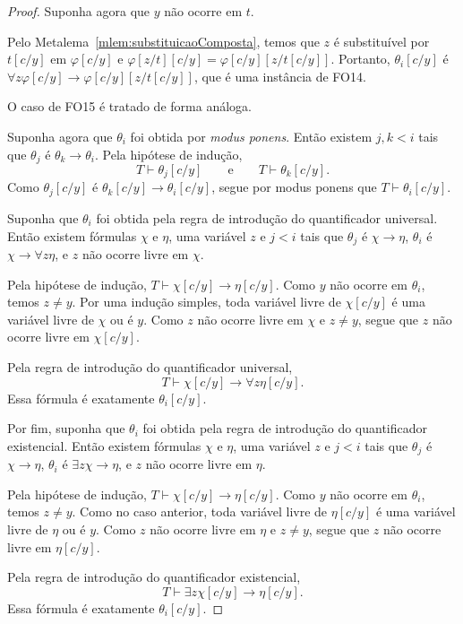 \begin{proof}
    Suponha agora que $y$ não ocorre em $t$.

    Pelo Metalema~\ref{mlem:substituicaoComposta}, temos que $z$ é substituível por $t[c/y]$ em $\varphi[c/y]$ e $\varphi[z/t][c/y]=\varphi[c/y][z/t[c/y]]$.
    Portanto, $\theta_i[c/y]$ é $\forall z\varphi[c/y]\rightarrow\varphi[c/y][z/t[c/y]]$, que é uma instância de FO14.

    O caso de FO15 é tratado de forma análoga.

    Suponha agora que $\theta_i$ foi obtida por \emph{modus ponens}.
    Então existem $j,k<i$ tais que $\theta_j$ é $\theta_k\rightarrow\theta_i$.
    Pela hipótese de indução,
    \[
        T\vdash \theta_j[c/y]\qquad\text{e} \qquad
         T\vdash \theta_k[c/y].
    \]
    Como $\theta_j[c/y]$ é $\theta_k[c/y]\rightarrow\theta_i[c/y]$, segue por modus ponens que $T\vdash \theta_i[c/y]$.

    Suponha que $\theta_i$ foi obtida pela regra de introdução do quantificador universal.
    Então existem fórmulas $\chi$ e $\eta$, uma variável $z$ e $j<i$ tais que $\theta_j$ é $\chi\rightarrow\eta$, $\theta_i$ é $\chi\rightarrow\forall z\eta$, e $z$ não ocorre livre em $\chi$.

    Pela hipótese de indução, $T\vdash \chi[c/y]\rightarrow\eta[c/y]$.
    Como $y$ não ocorre em $\theta_i$, temos $z\neq y$.
    Por uma indução simples, toda variável livre de $\chi[c/y]$ é uma variável livre de $\chi$ ou é $y$.
    Como $z$ não ocorre livre em $\chi$ e $z\neq y$, segue que $z$ não ocorre livre em $\chi[c/y]$.

    Pela regra de introdução do quantificador universal,
    \[
        T\vdash \chi[c/y]\rightarrow\forall z\eta[c/y].
    \]
    Essa fórmula é exatamente $\theta_i[c/y]$.

    Por fim, suponha que $\theta_i$ foi obtida pela regra de introdução do quantificador existencial.
    Então existem fórmulas $\chi$ e $\eta$, uma variável $z$ e $j<i$ tais que $\theta_j$ é $\chi\rightarrow\eta$, $\theta_i$ é $\exists z\chi\rightarrow\eta$, e $z$ não ocorre livre em $\eta$.

    Pela hipótese de indução, $T\vdash \chi[c/y]\rightarrow\eta[c/y]$.
    Como $y$ não ocorre em $\theta_i$, temos $z\neq y$.
    Como no caso anterior, toda variável livre de $\eta[c/y]$ é uma variável livre de $\eta$ ou é $y$.
    Como $z$ não ocorre livre em $\eta$ e $z\neq y$, segue que $z$ não ocorre livre em $\eta[c/y]$.

    Pela regra de introdução do quantificador existencial,
    \[
        T\vdash \exists z\chi[c/y]\rightarrow\eta[c/y].
    \]
    Essa fórmula é exatamente $\theta_i[c/y]$.


\end{proof}
